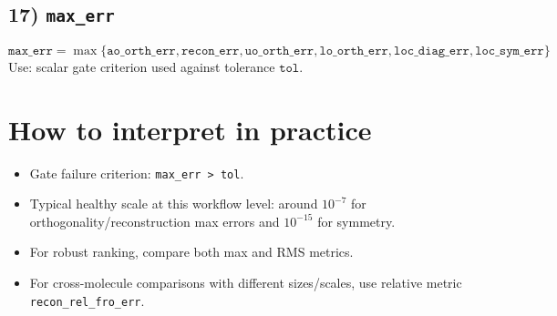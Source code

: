 \documentclass[11pt]{article}
\begin{document}
\subsection*{17) \texttt{max\_err}}
\[
\texttt{max\_err}=\max\{\texttt{ao\_orth\_err},\texttt{recon\_err},\texttt{uo\_orth\_err},\texttt{lo\_orth\_err},\texttt{loc\_diag\_err},\texttt{loc\_sym\_err}\}
\]
Use: scalar gate criterion used against tolerance $\texttt{tol}$.

\section{How to interpret in practice}
\begin{itemize}
  \item Gate failure criterion: \texttt{max\_err > tol}.
  \item Typical healthy scale at this workflow level: around $10^{-7}$ for orthogonality/reconstruction max errors and $10^{-15}$ for symmetry.
  \item For robust ranking, compare both max and RMS metrics.
  \item For cross-molecule comparisons with different sizes/scales, use relative metric \texttt{recon\_rel\_fro\_err}.
\end{itemize}
\end{document}

